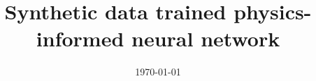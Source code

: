 \documentclass[a4paper,12pt]{article}
\title{Synthetic data trained physics-informed neural network}
\author{}
\date{\today}
\begin{document}
\maketitle

\begin{abstract}
\end{abstract}

\cite{de2019deep}



\end{document}
